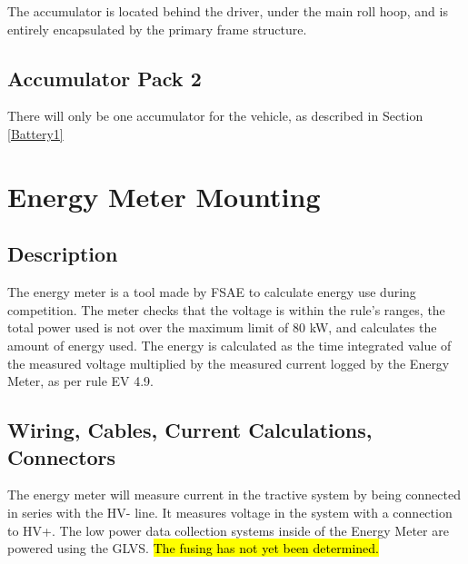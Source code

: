 \documentclass{article}
\DeclareRobustCommand{\hlr}[1]{{\sethlcolor{red}\hl{#1}}}
\begin{document}
        The accumulator is located behind the driver, under the main roll hoop, and is entirely encapsulated by the primary frame structure.

    \subsection{Accumulator Pack 2}
        There will only be one accumulator for the vehicle, as described in Section \ref{Battery1}

\newpage

\section{Energy Meter Mounting}

    \subsection{Description}


        The energy meter is a tool made by FSAE to calculate energy use during competition. The meter checks that the voltage is within the rule's ranges, the total power used is not over the maximum limit of 80 kW, and calculates the amount of energy used. The energy is calculated as the time integrated value of the measured voltage multiplied by the measured current logged by the Energy Meter, as per rule EV 4.9.

    \subsection{Wiring, Cables, Current Calculations, Connectors}


        The energy meter will measure current in the tractive system by being connected in series with the HV- line. It measures voltage in the system with a connection to HV+. The low power data collection systems inside of the Energy Meter are powered using the GLVS.
        \hlr{The fusing has not yet been determined.}
\end{document}
